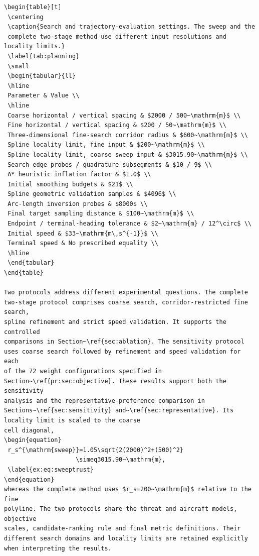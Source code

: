 \documentclass[12pt]{article}
\begin{document}
\begin{verbatim}
\begin{table}[t]
 \centering
 \caption{Search and trajectory-evaluation settings. The sweep and the
 complete two-stage method use different input resolutions and locality limits.}
 \label{tab:planning}
 \small
 \begin{tabular}{ll}
 \hline
 Parameter & Value \\
 \hline
 Coarse horizontal / vertical spacing & $2000 / 500~\mathrm{m}$ \\
 Fine horizontal / vertical spacing & $200 / 50~\mathrm{m}$ \\
 Three-dimensional fine-search corridor radius & $600~\mathrm{m}$ \\
 Spline locality limit, fine input & $200~\mathrm{m}$ \\
 Spline locality limit, coarse sweep input & $3015.90~\mathrm{m}$ \\
 Search edge probes / quadrature subsegments & $10 / 9$ \\
 A* heuristic inflation factor & $1.0$ \\
 Initial smoothing budgets & $21$ \\
 Spline geometric validation samples & $4096$ \\
 Arc-length inversion probes & $8000$ \\
 Final target sampling distance & $100~\mathrm{m}$ \\
 Endpoint / terminal-heading tolerance & $2~\mathrm{m} / 12^\circ$ \\
 Initial speed & $33~\mathrm{m\,s^{-1}}$ \\
 Terminal speed & No prescribed equality \\
 \hline
 \end{tabular}
\end{table}

Two protocols address different experimental questions. The complete
two-stage protocol comprises coarse search, corridor-restricted fine search,
spline refinement and strict speed validation. It supports the controlled
comparisons in Section~\ref{sec:ablation}. The sensitivity protocol
uses coarse search followed by refinement and speed validation for each
of the 72 weight configurations specified in
Section~\ref{pr:sec:objective}. These results support both the sensitivity
analysis and the representative-preference comparison in
Sections~\ref{sec:sensitivity} and~\ref{sec:representative}. Its locality limit is scaled to the coarse
cell diagonal,
\begin{equation}
 r_s^{\mathrm{sweep}}=1.05\sqrt{2(2000)^2+(500)^2}
                    \simeq3015.90~\mathrm{m},
 \label{ex:eq:sweeptrust}
\end{equation}
whereas the complete method uses $r_s=200~\mathrm{m}$ relative to the fine
polyline. The two protocols share the threat and aircraft models, objective
scales, candidate-ranking rule and final metric definitions. Their
different search domains and locality limits are retained explicitly
when interpreting the results.


\end{verbatim}
\end{document}
